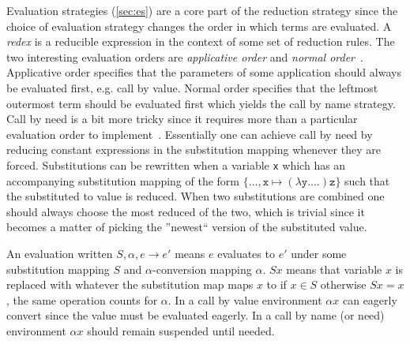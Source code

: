\documentclass[11pt,oneside,a4paper]{report}
\begin{document}
Evaluation strategies (\autoref{sec:es}) are a core part of the reduction strategy since the choice of evaluation strategy changes the order in which terms are evaluated.
A \textit{redex} is a reducible expression in the context of some set of reduction rules.
The two interesting evaluation orders are \textit{applicative order} and \textit{normal order}~\cite{sestoft2002demonstrating}.
Applicative order specifies that the parameters of some application should always be evaluated first, e.g. call by value.
Normal order specifies that the leftmost outermost term should be evaluated first which yields the call by name strategy.
Call by need is a bit more tricky since it requires more than a particular evaluation order to implement~\cite{levy1988sharing}.
Essentially one can achieve call by need by reducing constant expressions in the substitution mapping whenever they are forced.
Substitutions can be rewritten when a variable \texttt{x} which has an accompanying substitution mapping of the form $\{ \dots, \texttt{x} \mapsto (\lambda\texttt{y}.\dots) \texttt{z} \}$ such that the substituted to value is reduced.
When two substitutions are combined one should always choose the most reduced of the two, which is trivial since it becomes a matter of picking the ''newest`` version of the substituted value.

An evaluation written $S, \alpha, e \rightarrow e'$ means $e$ evaluates to $e'$ under some substitution mapping $S$ and $\alpha$-conversion mapping $\alpha$.
$Sx$ means that variable $x$ is replaced with whatever the substitution map maps $x$ to if $x \in S$ otherwise $Sx = x$, the same operation counts for $\alpha$.
In a call by value environment $\alpha x$ can eagerly convert since the value must be evaluated eagerly.
In a call by name (or need) environment $\alpha x$ should remain suspended until needed.
\end{document}
